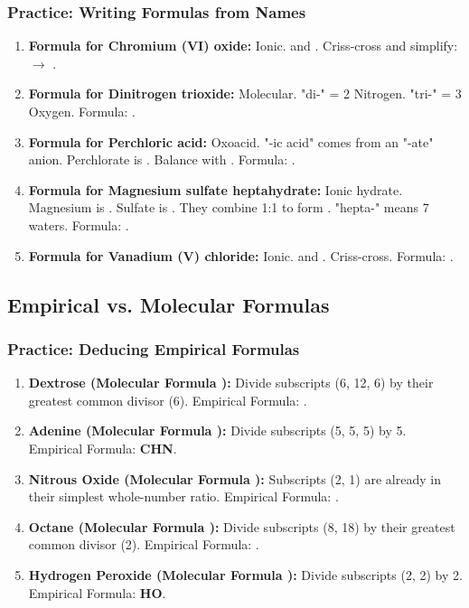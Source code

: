 \documentclass{article}
\begin{document}
\subsubsection*{Practice: Writing Formulas from Names}
\begin{enumerate}[itemsep=5pt]
    \item \textbf{Formula for Chromium (VI) oxide:} Ionic.  and . Criss-cross and simplify:  $\rightarrow$ \textbf{}.
    \item \textbf{Formula for Dinitrogen trioxide:} Molecular. "di-" = 2 Nitrogen. "tri-" = 3 Oxygen. Formula: \textbf{}.
    \item \textbf{Formula for Perchloric acid:} Oxoacid. "-ic acid" comes from an "-ate" anion. Perchlorate is . Balance with . Formula: \textbf{}.
    \item \textbf{Formula for Magnesium sulfate heptahydrate:} Ionic hydrate. Magnesium is . Sulfate is . They combine 1:1 to form . "hepta-" means 7 waters. Formula: \textbf{}.
    \item \textbf{Formula for Vanadium (V) chloride:} Ionic.  and . Criss-cross. Formula: \textbf{}.
\end{enumerate}

\subsection*{Empirical vs. Molecular Formulas}
\subsubsection*{Practice: Deducing Empirical Formulas}
\begin{enumerate}[itemsep=5pt]
    \item \textbf{Dextrose (Molecular Formula ):} Divide subscripts (6, 12, 6) by their greatest common divisor (6). Empirical Formula: \textbf{}.
    \item \textbf{Adenine (Molecular Formula ):} Divide subscripts (5, 5, 5) by 5. Empirical Formula: \textbf{CHN}.
    \item \textbf{Nitrous Oxide (Molecular Formula ):} Subscripts (2, 1) are already in their simplest whole-number ratio. Empirical Formula: \textbf{}.
    \item \textbf{Octane (Molecular Formula ):} Divide subscripts (8, 18) by their greatest common divisor (2). Empirical Formula: \textbf{}.
    \item \textbf{Hydrogen Peroxide (Molecular Formula ):} Divide subscripts (2, 2) by 2. Empirical Formula: \textbf{HO}.
\end{enumerate}
\end{document}
